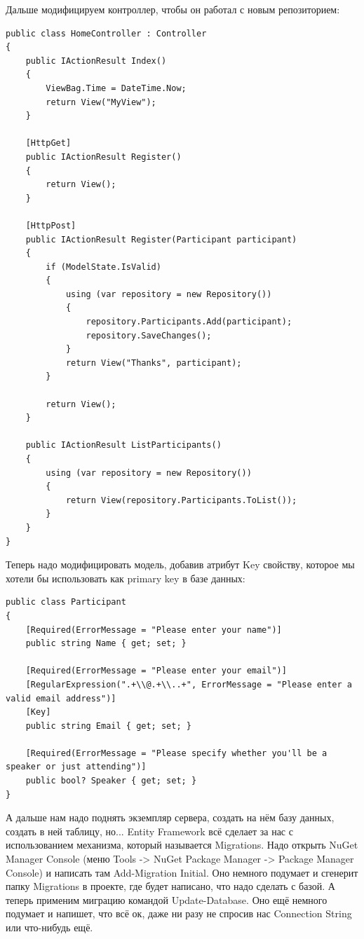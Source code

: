 \documentclass[a5paper]{article}
\begin{document}
Дальше модифицируем контроллер, чтобы он работал с новым репозиторием:

\begin{verbatim}
public class HomeController : Controller
{
    public IActionResult Index()
    {
        ViewBag.Time = DateTime.Now;
        return View("MyView");
    }

    [HttpGet]
    public IActionResult Register()
    {
        return View();
    }

    [HttpPost]
    public IActionResult Register(Participant participant)
    {
        if (ModelState.IsValid)
        {
            using (var repository = new Repository())
            {
                repository.Participants.Add(participant);
                repository.SaveChanges();
            }
            return View("Thanks", participant);
        }

        return View();
    }

    public IActionResult ListParticipants()
    {
        using (var repository = new Repository())
        {
            return View(repository.Participants.ToList());
        }
    }
}
\end{verbatim}

Теперь надо модифицировать модель, добавив атрибут Key свойству, которое мы хотели бы использовать как primary key в базе данных:

\begin{verbatim}
public class Participant
{
    [Required(ErrorMessage = "Please enter your name")]
    public string Name { get; set; }

    [Required(ErrorMessage = "Please enter your email")]
    [RegularExpression(".+\\@.+\\..+", ErrorMessage = "Please enter a valid email address")]
    [Key]
    public string Email { get; set; }

    [Required(ErrorMessage = "Please specify whether you'll be a speaker or just attending")]
    public bool? Speaker { get; set; }
}
\end{verbatim}

А дальше нам надо поднять экземпляр сервера, создать на нём базу данных, создать в ней таблицу, но... Entity Framework всё сделает за нас с использованием механизма, который называется Migrations. Надо открыть NuGet Manager Console (меню Tools -> NuGet Package Manager -> Package Manager Console) и
написать там Add-Migration Initial. Оно немного подумает и сгенерит папку Migrations в проекте, где будет написано, что надо сделать с базой. А теперь применим миграцию командой Update-Database. Оно ещё немного подумает и напишет, что всё ок, даже ни разу не спросив нас Connection String 
или что-нибудь ещё.
\end{document}
